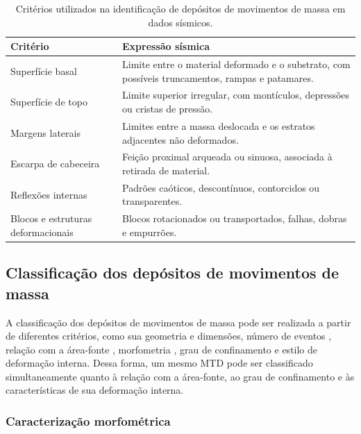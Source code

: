 \begin{table}[htbp]
  \centering
  \caption[Critérios utilizados na identificação de depósitos de movimentos de massa em dados sísmicos]{Critérios utilizados na identificação de depósitos de movimentos de massa em dados sísmicos.}
  \label{tab:resultado-2}
  \small
  \setlength{\tabcolsep}{2.5pt}
  \begin{tabularx}{\textwidth}{>{\raggedright\arraybackslash}X >{\centering\arraybackslash}X}
    \toprule
    \textbf{Critério} & \textbf{Expressão sísmica} \\
    \midrule
    Superfície basal & Limite entre o material deformado e o substrato, com possíveis truncamentos, rampas e patamares. \\
    Superfície de topo & Limite superior irregular, com montículos, depressões ou cristas de pressão. \\
    Margens laterais & Limites entre a massa deslocada e os estratos adjacentes não deformados. \\
    Escarpa de cabeceira & Feição proximal arqueada ou sinuosa, associada à retirada de material. \\
    Reflexões internas & Padrões caóticos, descontínuos, contorcidos ou transparentes. \\
    Blocos e estruturas deformacionais & Blocos rotacionados ou transportados, falhas, dobras e empurrões. \\
    \bottomrule
  \end{tabularx}
\end{table}

\subsection{Classificação dos depósitos de movimentos de massa}\label{sec:2-3-4}

A classificação dos depósitos de movimentos de massa pode ser realizada a partir de diferentes critérios, como sua geometria e dimensões, número de eventos \cite{clare2018}, relação com a área-fonte \cite{moscardelli2008}, morfometria \cite{moscardelli2016,clare2018}, grau de confinamento \cite{omosanya2013,frey2006,gamboa2016} e estilo de deformação interna. Dessa forma, um mesmo MTD pode ser classificado simultaneamente quanto à relação com a área-fonte, ao grau de confinamento e às características de sua deformação interna.

\subsubsection{Caracterização morfométrica}\label{sec:2-3-4-1}

